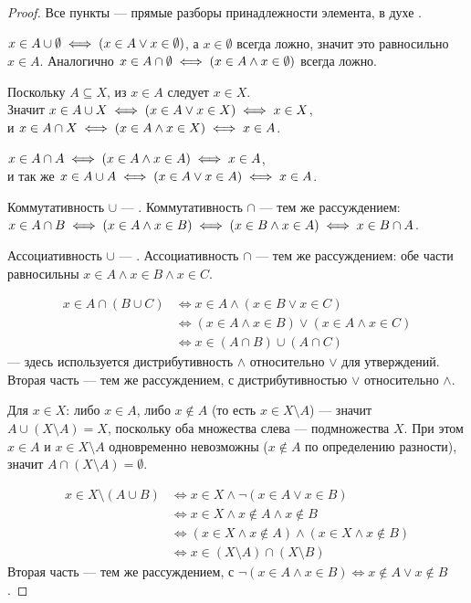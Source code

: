 \begin{proof}
Все пункты — прямые разборы принадлежности элемента, в духе .

 $x \in A \cup \emptyset \iff \nosplit{(x \in A \lor x \in \emptyset)}$, а
$x \in \emptyset$ всегда ложно, значит это равносильно $x \in A$. Аналогично
$x \in A \cap \emptyset \iff \nosplit{(x \in A \land x \in \emptyset)}$ всегда ложно.

 Поскольку $A \subseteq X$, из $x \in A$ следует $x \in X$.\\
Значит $x \in A \cup X \iff \nosplit{(x \in A \lor x \in X)} \iff x \in X$,\\
и $x \in A \cap X \iff \nosplit{(x \in A \land x \in X)} \iff x \in A$.

 $x \in A \cap A \iff \nosplit{(x \in A \land x \in A)} \iff x \in A$,\\
и так же $x \in A \cup A \iff \nosplit{(x \in A \lor x \in A)} \iff x \in A$.

 Коммутативность $\cup$ — .
Коммутативность $\cap$ — тем же рассуждением: $x \in A \cap B \iff \nosplit{(x \in A \land x \in B)}
\iff \nosplit{(x \in B \land x \in A)} \iff x \in B \cap A$.

 Ассоциативность $\cup$ — .
Ассоциативность $\cap$ — тем же рассуждением: обе части равносильны
$x \in A \land x \in B \land x \in C$.

\begin{align*}
  x \in A \cap (B \cup C) &\iff x \in A \land (x \in B \lor x \in C) \\
  &\iff (x \in A \land x \in B) \lor (x \in A \land x \in C) \\
  &\iff x \in (A \cap B) \cup (A \cap C)
\end{align*}
— здесь используется дистрибутивность $\land$ относительно $\lor$ для
утверждений. Вторая часть — тем же рассуждением, с дистрибутивностью $\lor$
относительно $\land$.

 Для $x \in X$: либо $x \in A$, либо $x \notin A$ (то есть
$x \in X \setminus A$) — значит $A \cup (X \setminus A) = X$, поскольку оба множества
слева — подмножества $X$. При этом $x \in A$ и $x \in X \setminus A$ одновременно
невозможны ($x \notin A$ по определению разности), значит $A \cap (X \setminus A) =
\emptyset$.

\begin{align*}
  x \in X \setminus (A \cup B) &\iff x \in X \land \neg(x \in A \lor x \in B) \\
  &\iff x \in X \land x \notin A \land x \notin B \\
  &\iff (x \in X \land x \notin A) \land (x \in X \land x \notin B) \\
  &\iff x \in (X \setminus A) \cap (X \setminus B)
\end{align*}
Вторая часть — тем же рассуждением, с $\neg(x \in A \land x \in B) \iff
x \notin A \lor x \notin B$.
\end{proof}

